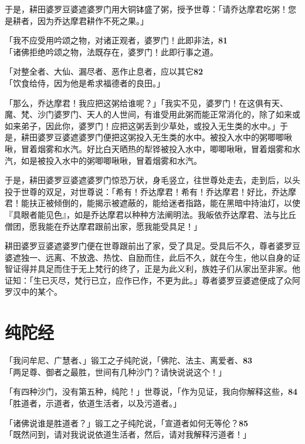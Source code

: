 于是，耕田婆罗豆婆遮婆罗门用大铜钵盛了粥，授予世尊：「请乔达摩君吃粥！您是耕者，因为乔达摩君耕作不死之果。」


「我不应受用吟颂之物，对诸正观者，婆罗门！此即非法，\hfill{\grayfootnotesize \textbf{81}} \\
「诸佛拒绝吟颂之物，法既存在，婆罗门！此即行事之道。


「对整全者、大仙、漏尽者、恶作止息者，应以其它\hfill{\grayfootnotesize \textbf{82}} \\
「饮食给侍，因为他是希求福德者的良田。」


「那么，乔达摩君！我应把这粥给谁呢？」「我实不见，婆罗门！在这俱有天、魔、梵、沙门婆罗门、天人的人世间，有谁受用此粥而能正常消化的，除了如来或如来弟子，因此你，婆罗门！应把这粥丢到少草处，或投入无生类的水中。」于是，耕田婆罗豆婆遮婆罗门便把这粥投入无生类的水中。被投入水中的粥唧唧啾啾，冒着烟雾和水汽。好比白天晒热的犁铧被投入水中，唧唧啾啾，冒着烟雾和水汽，如是被投入水中的粥唧唧啾啾，冒着烟雾和水汽。


于是，耕田婆罗豆婆遮婆罗门惊恐万状，身毛竖立，往世尊处走去，走到后，以头投于世尊的双足，对世尊说：「希有！乔达摩君！希有！乔达摩君！好比，乔达摩君！能扶正被倾倒的，能揭示被遮蔽的，能给迷者指路，能在黑暗中持油灯，以使『具眼者能见色』，如是乔达摩君以种种方法阐明法。我皈依乔达摩君、法与比丘僧团，愿我能在乔达摩君跟前出家，愿我能受具足！」


耕田婆罗豆婆遮婆罗门便在世尊跟前出了家，受了具足。受具后不久，尊者婆罗豆婆遮独一、远离、不放逸、热忱、自励而住，此后不久，就在今生，他以自身的证智证得并具足而住于无上梵行的终了，正是为此义利，族姓子们从家出至非家。他证知：「生已灭尽，梵行已立，应作已作，不更为此。」尊者婆罗豆婆遮便成了众阿罗汉中的某个。


\section{纯陀经}

「我问牟尼、广慧者、」锻工之子纯陀说，「佛陀、法主、离爱者、\hfill{\grayfootnotesize \textbf{83}} \\
「两足尊、御者之最胜，世间有几种沙门？请快说说这个！」


「有四种沙门，没有第五种，纯陀！」世尊说，「作为见证，我向你解释这些，\hfill{\grayfootnotesize \textbf{84}} \\
「胜道者，示道者，依道生活者，以及污道者。」


「诸佛说谁是胜道者？」锻工之子纯陀说，「宣道者如何无等伦？\hfill{\grayfootnotesize \textbf{85}} \\
「既然问到，请对我说说依道生活者，然后，请对我解释污道者！」



